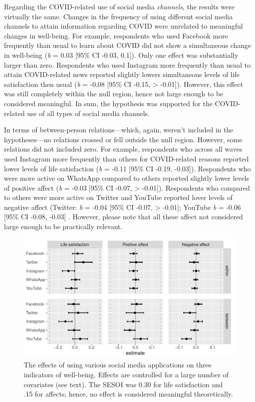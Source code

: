 \documentclass[
  english,
  man,floatsintext]{apa6}
\begin{document}
Regarding the COVID-related use of social media \emph{channels}, the results were virtually the same.
Changes in the frequency of using different social media channels to attain information regarding COVID were unrelated to meaningful changes in well-being.
For example, respondents who used Facebook more frequently than usual to learn about COVID did not show a simultaneous change in well-being (\emph{b} = 0.03 {[}95\% CI -0.03, 0.1{]}).
Only one effect was substantially larger than zero.
Respondents who used Instagram more frequently than usual to attain COVID-related news reported slightly lowers simultaneous levels of life satisfaction then usual (\emph{b} = -0.08 {[}95\% CI -0.15, \textgreater{} -0.01{]}).
However, this effect was still completely within the null region, hence not large enough to be considered meaningful.
In sum, the hypothesis was supported for the COVID-related use of all types of social media channels.

In terms of between-person relations---which, again, weren't included in the hypotheses---no relations crossed or fell outside the null region.
However, some relations did not included zero.
For example, respondents who across all waves used Instagram more frequently than others for COVID-related reasons reported lower levels of life satisfaction (\emph{b} = -0.11 {[}95\% CI -0.19, -0.03{]}).
Respondents who were more active on WhatsApp compared to others reported slightly lower levels of positive affect (\emph{b} = -0.03 {[}95\% CI -0.07, \textgreater{} -0.01{]}).
Respondents who compared to others were more active on Twitter and YouTube reported lover levels of negative affect (Twitter: \emph{b} = -0.04 {[}95\% CI -0.07, \textgreater{} -0.01{]};
YouTube \emph{b} = -0.06 {[}95\% CI -0.08, -0.03{]} .
However, please note that all these affect not considered large enough to be practically relevant.

\begin{figure}[!h]
\includegraphics[width=\textwidth]{figures/fig_results_channel} \caption{The effects of using various social media applications on three indicators of well-being. Effects are controlled for a large number of covariates (see text). The SESOI was 0.30 for life satisfaction and .15 for affects; hence, no effect is considered meaningful theoretically.}\label{fig:fig-res-channels}
\end{figure}
\end{document}

